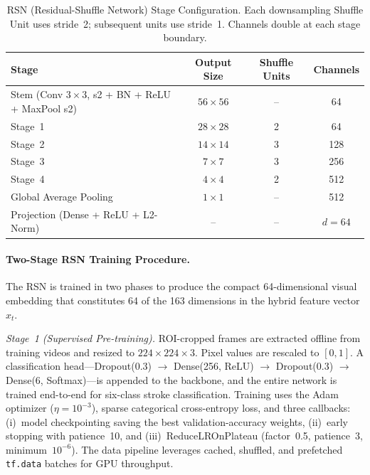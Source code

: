 \documentclass[pdflatex,sn-mathphys-num]{sn-jnl}
\theoremstyle{thmstyleone}%
\theoremstyle{thmstyletwo}%
\theoremstyle{thmstylethree}%
\begin{document}
\begin{table}[h]
\caption{RSN (Residual-Shuffle Network) Stage Configuration. Each downsampling Shuffle Unit uses stride~2; subsequent units use stride~1. Channels double at each stage boundary.}\label{tab_rsn_config}
\centering
\setlength{\tabcolsep}{5pt}
\renewcommand{\arraystretch}{1.3}
\begin{tabular}{|l|c|c|c|}
\hline
\textbf{Stage} & \textbf{Output Size} & \textbf{Shuffle Units} & \textbf{Channels} \\
\hline
Stem (Conv $3{\times}3$, s2 + BN + ReLU + MaxPool s2) & $56 \times 56$ & -- & 64 \\
\hline
Stage~1 & $28 \times 28$ & 2 & 64 \\
\hline
Stage~2 & $14 \times 14$ & 3 & 128 \\
\hline
Stage~3 & $7 \times 7$ & 3 & 256 \\
\hline
Stage~4 & $4 \times 4$ & 2 & 512 \\
\hline
Global Average Pooling & $1 \times 1$ & -- & 512 \\
\hline
Projection (Dense + ReLU + L2-Norm) & -- & -- & $d{=}64$ \\
\hline
\end{tabular}
\end{table}

\paragraph{Two-Stage RSN Training Procedure.}
The RSN is trained in two phases to produce the compact 64-dimensional visual embedding that constitutes 64 of the 163 dimensions in the hybrid feature vector $x_t$.

\textit{Stage~1 (Supervised Pre-training).}
ROI-cropped frames are extracted offline from training videos and resized to $224 \times 224 \times 3$. Pixel values are rescaled to $[0,1]$. A classification head---Dropout(0.3) $\!\to\!$ Dense(256, ReLU) $\!\to\!$ Dropout(0.3) $\!\to\!$ Dense(6, Softmax)---is appended to the backbone, and the entire network is trained end-to-end for six-class stroke classification. Training uses the Adam optimizer ($\eta = 10^{-3}$), sparse categorical cross-entropy loss, and three callbacks: (i)~model checkpointing saving the best validation-accuracy weights, (ii)~early stopping with patience~10, and (iii)~ReduceLROnPlateau (factor~0.5, patience~3, minimum~$10^{-6}$). The data pipeline leverages cached, shuffled, and prefetched \texttt{tf.data} batches for GPU throughput.
\end{document}
